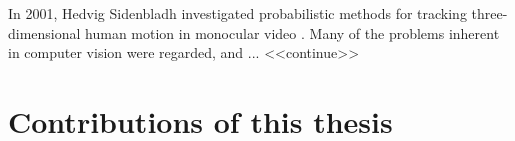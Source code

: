 In 2001, Hedvig Sidenbladh investigated probabilistic methods for tracking three-dimensional human motion in monocular video \cite{Hedvig}. 
Many of the problems inherent in computer vision were regarded, and ... <<continue>>

\section{Contributions of this thesis}





